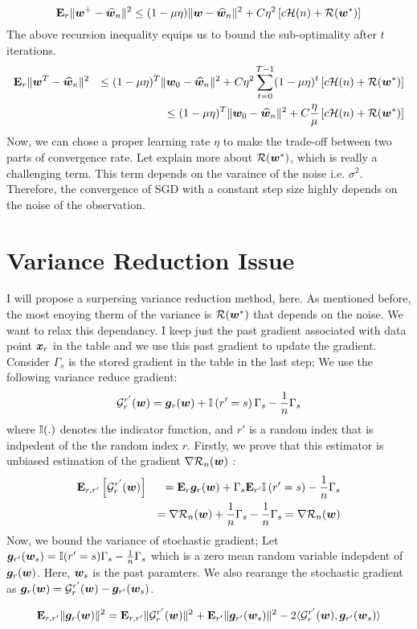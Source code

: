 \documentclass{article}
\begin{document}
\begin{equation*}
	\mathbf{E}_r \| \bm{w}^+ - \widehat{\bm{w}}_n\|^2 \leq (1-\mu \eta) \| \bm{w} - \widehat{\bm{w}}_n \|^2 + C \eta^2 \left[c
	{\cal H}(n) + {\cal R}(\bm{w}^*)\right]
\end{equation*}
The above recursion inequality equips us to bound the sub-optimality after $t$
iterations. 
\begin{eqnarray*}
	& \mathbf{E}_r \| \bm{w}^T - \widehat{\bm{w}}_n\|^2 & \leq (1-\mu \eta)^T \| \bm{w}_0 - \widehat{\bm{w}}_n \|^2 + C \eta^2
	\sum_{t=0}^{T-1} (1-\mu \eta)^{t} \left[c
	{\cal H}(n) + {\cal R}(\bm{w}^*)\right] \\ 
	& & \leq  (1-\mu \eta)^T \| \bm{w}_0 - \widehat{\bm{w}}_n \|^2 + C \frac{\eta}{\mu}
	 \left[c
	{\cal H}(n) + {\cal R}(\bm{w}^*)\right]
\end{eqnarray*}
Now, we can chose a proper learning rate $\eta$ to make the trade-off between
two parts of convergence rate. 
Let explain more about ${\cal R}(\bm{w}^*)$, which is really a challenging term. This
term depends on the varaince of the noise i.e. $\sigma^2$. Therefore, the
convergence of SGD with a constant step size highly depends on the noise of the
observation. 
\section{Variance Reduction Issue}
I will propose a surpersing variance reduction method, here. As mentioned
before, the most enoying therm of the variance is ${\cal R}(\bm{w}^*)$ that depends on
the noise. We want to relax this dependancy. I keep just the past gradient
associated with data point $\bm{x}_r$ in the table and we use this past gradient to
update the gradient. Consider $\Gamma_s$ is the stored gradient in the table in
the last step; We use the following variance reduce gradient: 
\begin{equation*}
	{\cal G}_r^{r'}(\bm{w}) = \bm{g}_r(\bm{w}) + \mathbb{I} \left(r' = s \right) \Gamma_s - \frac{1}{n}
	\Gamma_s
\end{equation*}
where $\mathbb{I}(.)$ denotes the indicator function, and $r'$ is a random index that is
indpedent of the the random index $r$. Firstly, we prove that this estimator is
unbiased estimation of the gradient $\nabla {\cal R}_n(\bm{w})$ :
\begin{eqnarray*}
 & \mathbf{E}_{r,r'} \left[{\cal G}_r^{r'}(\bm{w}) \right] & = \mathbf{E}_r \bm{g}_r(\bm{w}) + \Gamma_s \mathbf{E}_{r'} \mathbb{I}
 \left(r' = s \right) - \frac{1}{n} \Gamma_s \\ 
 & & = \nabla {\cal R}_n(\bm{w}) + \frac{1}{n} \Gamma_s - \frac{1}{n} \Gamma_s = \nabla
 {\cal R}_n(\bm{w})
\end{eqnarray*}
Now, we bound the variance of stochastic gradient; Let $\bm{g}_{r'}(\bm{w}_s) = \mathbb{I}(r'=s)
\Gamma_s - \frac{1}{n} \Gamma_s$ which is a zero mean random variable indepdent
of $\bm{g}_r(\bm{w})$. Here, $\bm{w}_s$ is the past paramters. We also rearange the
stochastic gradient as $\bm{g}_r(\bm{w}) = {\cal G}_r^{r'}(\bm{w}) - \bm{g}_{r'}(\bm{w}_s)$.

\begin{equation*}
	\mathbf{E}_{r,r'} \|\bm{g}_r(\bm{w}) \|^2 = \mathbf{E}_{r,r'} \| {\cal G}_r^{r'}(\bm{w}) \|^2 + \mathbf{E}_{r'}\| 
	\bm{g}_{r'}(\bm{w}_s) \|^2 - 2 \langle {\cal G}_r^{r'}(\bm{w}), \bm{g}_{r'}(\bm{w}_s) \rangle
\end{equation*}
\end{document}
